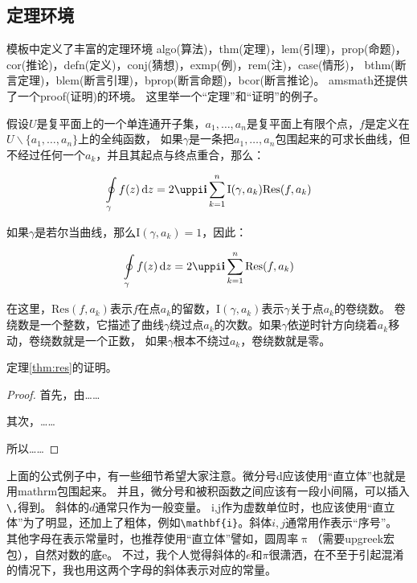 \documentclass[doctor,openright,twoside]{sjtuthesis}
\theoremstyle{plain}
\theoremstyle{definition}
\theoremstyle{remark}
\theoremstyle{ocrenumbox}
\theoremstyle{plain}
\newcommand\cqh{“}
\newcommand\cqt{”}
\begin{document}
\subsection{定理环境}

模板中定义了丰富的定理环境
algo(算法)，thm(定理)，lem(引理)，prop(命题)，cor(推论)，defn(定义)，conj(猜想)，exmp(例)，rem(注)，case(情形)，
bthm(断言定理)，blem(断言引理)，bprop(断言命题)，bcor(断言推论)。
amsmath还提供了一个proof(证明)的环境。
这里举一个\cqh 定理\cqt 和\cqh 证明\cqt 的例子。

\begin{thm}[留数定理]
\label{thm:res}
  假设$U$是复平面上的一个单连通开子集，$a_1,\ldots,a_n$是复平面上有限个点，$f$是定义在$U\backslash \{a_1,\ldots,a_n\}$上的全纯函数，
  如果$\gamma$是一条把$a_1,\ldots,a_n$包围起来的可求长曲线，但不经过任何一个$a_k$，并且其起点与终点重合，那么：

  \begin{equation}
    \label{eq:res}
    \ointop_{\gamma}f(z)\,\mathrm{d}z = 2\uppi\mathbf{i}\sum^n_{k=1}\mathrm{I}(\gamma,a_k)\mathrm{Res}(f,a_k)
  \end{equation}

  如果$\gamma$是若尔当曲线，那么$\mathrm{I}(\gamma, a_k)=1$，因此：

  \begin{equation}
    \label{eq:resthm}
    \ointop_{\gamma}f(z)\,\mathrm{d}z = 2\uppi\mathbf{i}\sum^n_{k=1}\mathrm{Res}(f,a_k)
  \end{equation}


  在这里，$\mathrm{Res}(f, a_k)$表示$f$在点$a_k$的留数，$\mathrm{I}(\gamma,a_k)$表示$\gamma$关于点$a_k$的卷绕数。
  卷绕数是一个整数，它描述了曲线$\gamma$绕过点$a_k$的次数。如果$\gamma$依逆时针方向绕着$a_k$移动，卷绕数就是一个正数，
  如果$\gamma$根本不绕过$a_k$，卷绕数就是零。

  定理\ref{thm:res}的证明。

  \begin{proof}
    首先，由……

    其次，……

    所以……
  \end{proof}
\end{thm}

上面的公式例子中，有一些细节希望大家注意。微分号d应该使用\cqh 直立体\cqt 也就是用mathrm包围起来。
并且，微分号和被积函数之间应该有一段小间隔，可以插入\verb+\,+得到。
斜体的\(d\)通常只作为一般变量。
i,j作为虚数单位时，也应该使用\cqh 直立体\cqt 为了明显，还加上了粗体，例如\verb+\mathbf{i}+。斜体\(i,j\)通常用作表示\cqh 序号\cqt 。
其他字母在表示常量时，也推荐使用\cqh 直立体\cqt 譬如，圆周率\(\uppi\)（需要upgreek宏包），自然对数的底\(\mathrm{e}\)。
不过，我个人觉得斜体的\(e\)和\(\pi\)很潇洒，在不至于引起混淆的情况下，我也用这两个字母的斜体表示对应的常量。
\end{document}

